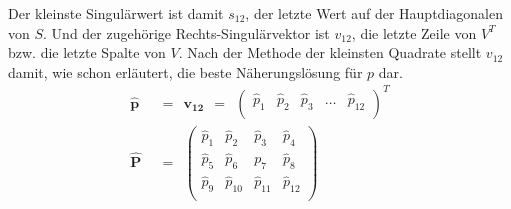 \noindent Der kleinste Singulärwert ist damit $s_{12}$, der letzte Wert auf der Hauptdiagonalen von $S$. Und der zugehörige Rechts-Singulärvektor ist $v_{12}$, die letzte Zeile von $V^T$ bzw. die letzte Spalte von $V$. Nach der Methode der kleinsten Quadrate stellt $v_{12}$ damit, wie schon erläutert, die beste Näherungslösung für $p$ dar.
\begin{align}
	\boldsymbol{\widehat{p}} {\:\:}&={\:\:} \boldsymbol{v_{12}} {\:\:}={\:\:} \begin{pmatrix}\widehat{p}_1&\widehat{p}_2&\widehat{p}_3&\dots&\widehat{p}_{12}\\\end{pmatrix}^T\\
	\boldsymbol{\widehat{P}} {\:\:}&={\:\:} \begin{pmatrix}\widehat{p}_1&\widehat{p}_2&\widehat{p}_3&\widehat{p}_4\\\widehat{p}_5&\widehat{p}_6&p_7&\widehat{p}_8\\\widehat{p}_9&\widehat{p}_{10}&\widehat{p}_{11}&\widehat{p}_{12}\\\end{pmatrix}
\end{align}\mittelgrosserabstand

